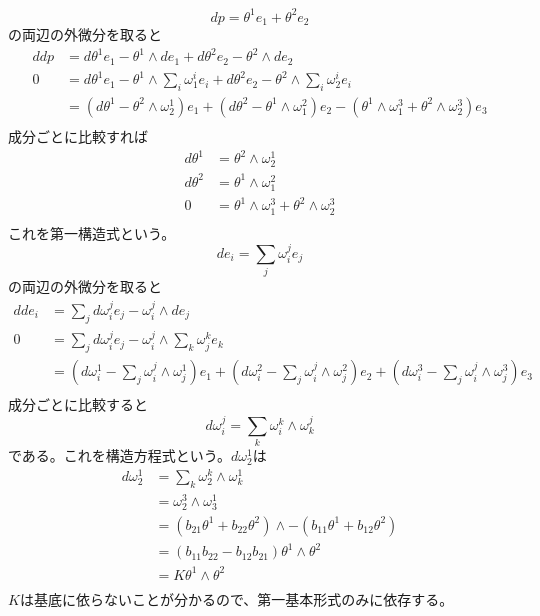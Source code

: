             \[dp = \theta^1e_1 + \theta^2e_2\]
        の両辺の外微分を取ると
        \begin{align*}
            ddp &= d\theta^1e_1 - \theta^1 \wedge de_1 + d\theta^2e_2 - \theta^2 \wedge de_2\\
            0 &= d\theta^1e_1 - \theta^1 \wedge \sum_i \omega^i_1e_i + d\theta^2e_2 - \theta^2 \wedge \sum_i \omega^i_2e_i\\
            &= (d\theta^1 - \theta^2 \wedge \omega^1_2)e_1 + (d\theta^2 - \theta^1 \wedge \omega^2_1)e_2 - (\theta^1 \wedge \omega^3_1 + \theta^2 \wedge \omega^3_2)e_3\\
        \end{align*}
        成分ごとに比較すれば
        \begin{align*}
            d\theta^1 &= \theta^2 \wedge \omega^1_2\\
            d\theta^2 &= \theta^1 \wedge \omega^2_1\\
            0 &= \theta^1 \wedge \omega^3_1 + \theta^2 \wedge \omega^3_2\\
        \end{align*}
        これを第一構造式という。
            \[de_i = \sum_j \omega^j_ie_j\]
        の両辺の外微分を取ると
        \begin{align*}
            dde_i &= \sum_j d\omega^j_ie_j - \omega^j_i \wedge de_j\\
            0 &= \sum_j d\omega^j_ie_j - \omega^j_i \wedge \sum_k \omega^k_je_k\\
            &= (d\omega^1_i - \sum_j \omega^j_i \wedge \omega^1_j)e_1 + (d\omega^2_i - \sum_j \omega^j_i \wedge \omega^2_j)e_2 + (d\omega^3_i - \sum_j \omega^j_i \wedge \omega^3_j)e_3\\
        \end{align*}
        成分ごとに比較すると
            \[d\omega^j_i = \sum_k \omega^k_i \wedge \omega^j_k\]
        である。これを構造方程式という。$d\omega^1_2$は
        \begin{align*}
            d\omega^1_2 &= \sum_k \omega^k_2 \wedge \omega^1_k\\
            &= \omega^3_2 \wedge \omega^1_3\\
            &= (b_{21}\theta^1 + b_{22}\theta^2) \wedge -(b_{11}\theta^1 + b_{12}\theta^2)\\
            &= (b_{11}b_{22} - b_{12}b_{21})\theta^1 \wedge \theta^2\\
            &= K\theta^1 \wedge \theta^2\\
        \end{align*}
        $K$は基底に依らないことが分かるので、第一基本形式のみに依存する。

